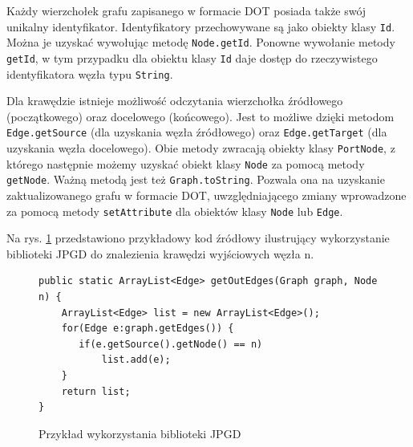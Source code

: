 Każdy wierzchołek grafu zapisanego w formacie DOT posiada także swój unikalny identyfikator. Identyfikatory przechowywane są jako obiekty klasy \texttt{Id}. Można je uzyskać wywołując metodę \texttt{Node.getId}. Ponowne wywołanie metody \texttt{getId}, w tym przypadku dla obiektu klasy \texttt{Id} daje dostęp do rzeczywistego identyfikatora węzła typu \texttt{String}. 

Dla krawędzie istnieje możliwość odczytania wierzchołka źródłowego (początkowego) oraz docelowego (końcowego). Jest to możliwe dzięki metodom \texttt{Edge.getSource} (dla uzyskania węzła źródłowego) oraz \texttt{Edge.getTarget} (dla uzyskania węzła docelowego). Obie metody zwracają obiekty klasy \texttt{PortNode}, z którego następnie możemy uzyskać obiekt klasy \texttt{Node} za pomocą metody \texttt{getNode}. Ważną metodą jest też \texttt{Graph.toString}. Pozwala ona na uzyskanie zaktualizowanego grafu w formacie DOT, uwzględniającego zmiany wprowadzone za pomocą metody \texttt{setAttribute} dla obiektów klasy \texttt{Node} lub \texttt{Edge}. 

Na rys. \ref{fig:jgpd} przedstawiono przykładowy kod źródłowy ilustrujący wykorzystanie biblioteki JPGD do znalezienia krawędzi wyjściowych węzła n.

\begin{figure}
\begin{verbatim}
public static ArrayList<Edge> getOutEdges(Graph graph, Node n) {
    ArrayList<Edge> list = new ArrayList<Edge>();
    for(Edge e:graph.getEdges()) {
       if(e.getSource().getNode() == n)
           list.add(e);
    }
    return list;
}
\end{verbatim}
\caption{Przykład wykorzystania biblioteki JPGD}
\label{fig:jgpd}
\end{figure}

